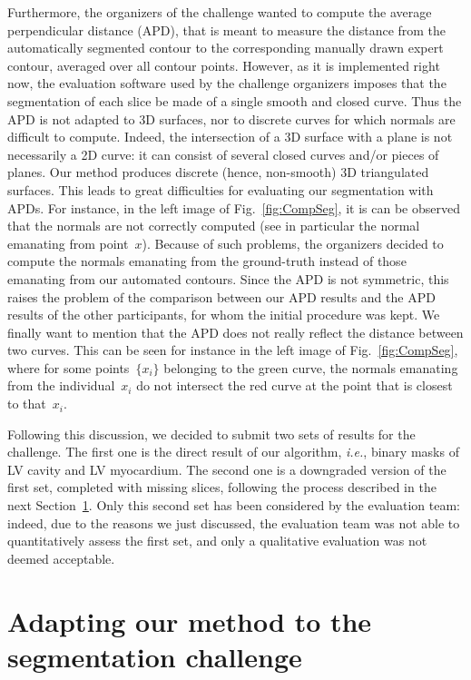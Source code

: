 \documentclass{llncs}
\begin{document}
Furthermore, the organizers of the challenge wanted to compute the
average perpendicular distance (APD), that is meant to measure the
distance from the automatically segmented contour to the corresponding
manually drawn expert contour, averaged over all contour points.
However, as it is implemented right now, the evaluation software used
by the challenge organizers imposes that the segmentation of each
slice be made of a single smooth and closed curve. Thus the APD is not
adapted to 3D surfaces, nor to discrete curves for which normals are
difficult to compute. Indeed, the intersection of a 3D surface with a
plane is not necessarily a 2D curve: it can consist of several closed
curves and/or pieces of planes. Our method produces discrete (hence,
non-smooth) 3D triangulated surfaces. This leads to great difficulties
for evaluating our segmentation with APDs. For instance, in the left
image of Fig.~\ref{fig:CompSeg}, it is can be observed that the
normals are not correctly computed (see in particular the normal
emanating from point~$x$). Because of such problems, the organizers
decided to compute the normals emanating from the ground-truth instead
of those emanating from our automated contours. Since the APD is not
symmetric, this raises the problem of the comparison between our APD
results and the APD results of the other participants, for whom the
initial procedure was kept. We finally want to mention that the APD
does not really reflect the distance between two curves. This can be
seen for instance in the left image of Fig.~\ref{fig:CompSeg}, where
for some points~$\{x_i\}$ belonging to the green curve, the normals
emanating from the individual~$x_i$ do not intersect the red curve at 
the point that is closest to that~$x_i$.

Following this discussion, we decided to submit two sets of results
for the challenge. The first one is the direct result of our
algorithm, {\em i.e.}, binary masks of LV cavity and LV
myocardium. The second one is a downgraded version of the first set,
completed with missing slices, following the process described in the
next Section~\ref{sec:adapt}. Only this second set has been considered
by the evaluation team: indeed, due to the reasons we just discussed,
the evaluation team was not able to quantitatively assess the first
set, and only a qualitative evaluation was not deemed acceptable.

\section{Adapting our method to the segmentation challenge}
\label{sec:adapt}
\end{document}
